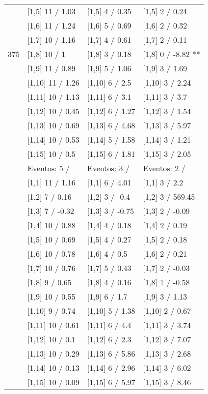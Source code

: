 \begin{table}
\begin{tabular}[t]{llll}
 & {}[1,5] 11  / 1.03 & {}[1,5] 4  / 0.35 & {}[1,5] 2  / 0.24\\
 & {}[1,6] 11  / 1.24 & {}[1,6] 5  / 0.69 & {}[1,6] 2  / 0.32\\
 & {}[1,7] 10  / 1.16 & {}[1,7] 4  / 0.61 & {}[1,7] 2  / 0.11\\
375 & {}[1,8] 10  / 1 & {}[1,8] 3  / 0.18 & {}[1,8] 0  / -8.82 **\\
\addlinespace
 & {}[1,9] 11  / 0.89 & {}[1,9] 5  / 1.06 & {}[1,9] 3  / 1.69\\
 & {}[1,10] 11  / 1.26 & {}[1,10] 6  / 2.5 & {}[1,10] 3  / 2.24\\
 & {}[1,11] 10  / 1.13 & {}[1,11] 6  / 3.1 & {}[1,11] 3  / 3.7\\
 & {}[1,12] 10  / 0.45 & {}[1,12] 6  / 1.27 & {}[1,12] 3  / 1.54\\
 & {}[1,13] 10  / 0.69 & {}[1,13] 6  / 4.68 & {}[1,13] 3  / 5.97\\
\addlinespace
 & {}[1,14] 10  / 0.53 & {}[1,14] 5  / 1.58 & {}[1,14] 3  / 1.21\\
 & {}[1,15] 10  / 0.5 & {}[1,15] 6  / 1.81 & {}[1,15] 3  / 2.05\\
 & Eventos:  5 / & Eventos:  3 / & Eventos:  2 /\\
 & {}[1,1] 11  / 1.16 & {}[1,1] 6  / 4.01 & {}[1,1] 3  / 2.2\\
 & {}[1,2] 7  / 0.16 & {}[1,2] 3  / -0.4 & {}[1,2] 3  / 569.45\\
\addlinespace
 & {}[1,3] 7  / -0.32 & {}[1,3] 3  / -0.75 & {}[1,3] 2  / -0.09\\
 & {}[1,4] 10  / 0.88 & {}[1,4] 4  / 0.18 & {}[1,4] 2  / 0.19\\
 & {}[1,5] 10  / 0.69 & {}[1,5] 4  / 0.27 & {}[1,5] 2  / 0.18\\
 & {}[1,6] 10  / 0.78 & {}[1,6] 4  / 0.5 & {}[1,6] 2  / 0.21\\
 & {}[1,7] 10  / 0.76 & {}[1,7] 5  / 0.43 & {}[1,7] 2  / -0.03\\
\addlinespace
500 & {}[1,8] 9  / 0.65 & {}[1,8] 4  / 0.16 & {}[1,8] 1  / -0.58\\
 & {}[1,9] 10  / 0.55 & {}[1,9] 6  / 1.7 & {}[1,9] 3  / 1.13\\
 & {}[1,10] 9  / 0.74 & {}[1,10] 5  / 1.38 & {}[1,10] 2  / 0.67\\
 & {}[1,11] 10  / 0.61 & {}[1,11] 6  / 4.4 & {}[1,11] 3  / 3.74\\
 & {}[1,12] 10  / 0.1 & {}[1,12] 6  / 2.3 & {}[1,12] 3  / 7.07\\
\addlinespace
 & {}[1,13] 10  / 0.29 & {}[1,13] 6  / 5.86 & {}[1,13] 3  / 2.68\\
 & {}[1,14] 10  / 0.13 & {}[1,14] 6  / 2.96 & {}[1,14] 3  / 6.02\\
 & {}[1,15] 10  / 0.09 & {}[1,15] 6  / 5.97 & {}[1,15] 3  / 8.46\\
\bottomrule
\end{tabular}
\end{table}
